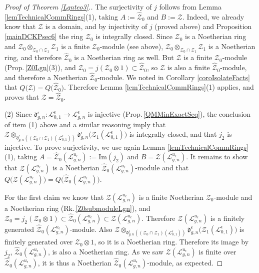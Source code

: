 \documentclass[11pt]{amsart}
\newcommand{\e}{\epsilon}
\newcommand{\Ll}{\mathcal{L}}
\begin{document}
\begin{proof}[Proof of Theorem \ref{Lgnteo3}.]
The surjectivity of $j$ follows from Lemma \ref{lemTechnicalCommRings}(1), taking  $A:=\hat{\mathcal{Z}}_0$ and $B:=\mathcal{Z}$. Indeed, we already know that $\mathcal{Z}$ is a domain, and by injectivity of $j$ (proved above) and Proposition \ref{mainDCKPsec6} the ring $\hat{\mathcal{Z}}_0$ is integrally closed. Since $\mathcal{Z}_0$ is a Noetherian ring and $\mathcal{Z}_0\otimes_{\mathcal{Z}_0 \cap \mathcal{Z}_1} \mathcal{Z}_1$ is a finite $\mathcal{Z}_0$-module (see above), $\mathcal{Z}_0 \otimes_{\mathcal{Z}_0 \cap \mathcal{Z}_1} \mathcal{Z}_1$ is a Noetherian ring, and therefore $\hat{\mathcal{Z}}_0$ is a Noetherian ring as well. But $\mathcal{Z}$ is a finite $\mathcal{Z}_0$-module (Prop.\,\ref{Z0Lgn}(3)), and $\mathcal{Z}_0 = j(\mathcal{Z}_0\otimes 1)\subset \hat{\mathcal{Z}}_0$, so $\mathcal{Z}$ is also a finite $\hat{\mathcal{Z}}_0$-module, and therefore a Noetherian $\hat{\mathcal{Z}}_0$-module. We noted in Corollary \ref{coroIsolateFacts} that $Q\bigl( \mathcal{Z} \bigr) = Q\bigl( \hat{\mathcal{Z}}_0 \bigr)$. Therefore Lemma \ref{lemTechnicalCommRings}(1) applies, and proves that $\mathcal{Z} = \hat{\mathcal{Z}}_0$. 

\smallskip

\indent (2) Since $\mathfrak{d}_{g,n}^{\e} : \mathcal{L}_{0,1}^\e \to \mathcal{L}_{g,n}^{\e}$ is injective (Prop.\,\ref{QMMinExactSeq}), the conclusion of item (1) above and a similar reasoning imply that $\mathcal{Z} \otimes_{\mathfrak{d}_{g,n}^{\e}\left( (\mathcal{Z}_0 \cap \mathcal{Z}_1)(\Ll_{0,1}^\e) \right)} \mathfrak{d}_{g,n}^{\e}\bigl( \mathcal{Z}_1(\Ll_{0,1}^\e) \bigr)$ is integrally closed, and that $j_2$ is injective. To prove surjectivity, we use again Lemma \ref{lemTechnicalCommRings}(1), taking $A= \hat{\mathcal{Z}}_0(\Ll_{g,n}^{u_\e}):= \mathrm{Im}(j_2)$ and $B=\mathcal{Z}(\Ll_{g,n}^{u_\e})$. It remains to show that $\mathcal{Z}(\Ll_{g,n}^{u_\e})$ is a Noetherian $\hat{\mathcal{Z}}_0(\Ll_{g,n}^{u_\e})$-module and that $Q\bigl(\mathcal{Z}(\Ll_{g,n}^{u_\e})\bigr) = Q\bigl( \hat{\mathcal{Z}}_0(\Ll_{g,n}^{u_\e}) \bigr)$.

For the first claim we know that $\mathcal{Z}(\Ll_{g,n}^{u_\e})$ is a finite Noetherian $\mathcal{Z}_0$-module and a Noetherian ring (Rk.\,\ref{Z0submoduleLgn}), and $\mathcal{Z}_0 = j_2(\mathcal{Z}_0\otimes 1) \subset \hat{\mathcal{Z}}_0(\Ll_{g,n}^{u_\e}) \subset \mathcal{Z}(\Ll_{g,n}^{u_\e})$. Therefore $\mathcal{Z}(\Ll_{g,n}^{u_\e})$ is a finitely generated $\hat{\mathcal{Z}}_0(\Ll_{g,n}^{u_\e})$-module. Also $\mathcal{Z} \otimes_{\mathfrak{d}_{g,n}^{\e}\left( (\mathcal{Z}_0 \cap \mathcal{Z}_1)(\Ll_{0,1}^\e) \right)} \mathfrak{d}_{g,n}^{\e}\bigl( \mathcal{Z}_1(\Ll_{0,1}^\e) \bigr)$ is finitely generated over $\mathcal{Z}_0\otimes 1$, so it is a Noetherian ring. Therefore its image by $j_2$, $\hat{\mathcal{Z}}_0(\Ll_{g,n}^{u_\e})$, is also a Noetherian ring. As we saw $\mathcal{Z}(\Ll_{g,n}^{u_\e})$ is finite over $\hat{\mathcal{Z}}_0(\Ll_{g,n}^{u_\e})$, it is thus a Noetherian $\hat{\mathcal{Z}}_0(\Ll_{g,n}^{u_\e})$-module, as expected. 


\end{proof}
\end{document}
